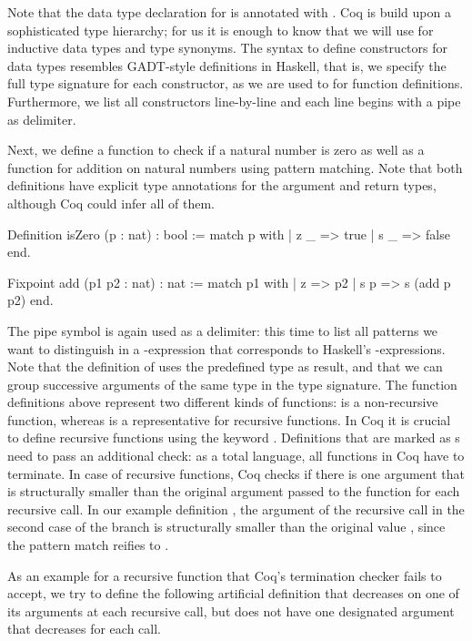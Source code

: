 Note that the data type declaration for  is annotated with .
Coq is build upon a sophisticated type hierarchy; for us it is enough to know that we will use  for inductive data types and type synonyms.
The syntax to define constructors for data types resembles GADT\--style definitions in Haskell, that is, we specify the full type signature for each constructor, as we are used to for function definitions.
Furthermore, we list all constructors line\--by\--line and each line begins with a pipe \cinl{|} as delimiter.

Next, we define a function to check if a natural number  is zero as well as a function for addition on natural numbers using pattern matching.
Note that both definitions have explicit type annotations for the argument and return types, although Coq could infer all of them.

\begin{coqcode}
Definition isZero (p : nat) : bool :=
  match p with
  | z  _ => true
  | s _ => false
  end.

Fixpoint add (p1 p2 : nat) : nat :=
  match p1 with
  | z   => p2
  | s p => s (add p p2)
  end.
\end{coqcode}

The pipe symbol \cinl{|} is again used as a delimiter: this time to list all patterns we want to distinguish in a \--expression that corresponds to Haskell's \--expressions.
Note that the definition of  uses the predefined  type as result, and that we can group successive arguments of the same type in the type signature.
The function definitions above represent two different kinds of functions:  is a non\--recursive function, whereas  is a representative for recursive functions.
In Coq it is crucial to define recursive functions using the keyword .
Definitions that are marked as s need to pass an additional check: as a total language, all functions in Coq have to terminate.
In case of recursive functions, Coq checks if there is one argument that is structurally smaller than the original argument passed to the function for each recursive call.
In our example definition , the argument  of the recursive call in the second case of the branch is structurally smaller than the original value , since the pattern match reifies  to .

As an example for a recursive function that Coq's termination checker fails to accept, we try to define the following artificial definition that decreases on one of its arguments at each recursive call, but does not have one designated argument that decreases for each call.


